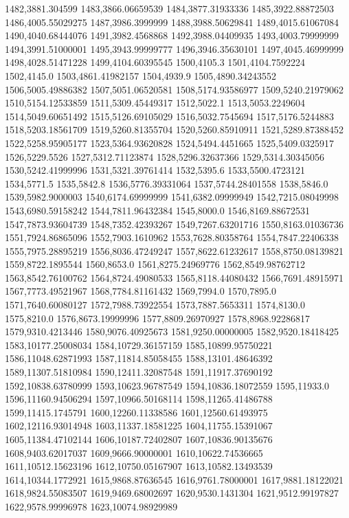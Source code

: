 1482,3881.304599
1483,3866.06659539
1484,3877.31933336
1485,3922.88872503
1486,4005.55029275
1487,3986.3999999
1488,3988.50629841
1489,4015.61067084
1490,4040.68444076
1491,3982.4568868
1492,3988.04409935
1493,4003.79999999
1494,3991.51000001
1495,3943.99999777
1496,3946.35630101
1497,4045.46999999
1498,4028.51471228
1499,4104.60395545
1500,4105.3
1501,4104.7592224
1502,4145.0
1503,4861.41982157
1504,4939.9
1505,4890.34243552
1506,5005.49886382
1507,5051.06520581
1508,5174.93586977
1509,5240.21979062
1510,5154.12533859
1511,5309.45449317
1512,5022.1
1513,5053.2249604
1514,5049.60651492
1515,5126.69105029
1516,5032.7545694
1517,5176.5244883
1518,5203.18561709
1519,5260.81355704
1520,5260.85910911
1521,5289.87388452
1522,5258.95905177
1523,5364.93620828
1524,5494.4451665
1525,5409.0325917
1526,5229.5526
1527,5312.71123874
1528,5296.32637366
1529,5314.30345056
1530,5242.41999996
1531,5321.39761414
1532,5395.6
1533,5500.4723121
1534,5771.5
1535,5842.8
1536,5776.39331064
1537,5744.28401558
1538,5846.0
1539,5982.9000003
1540,6174.69999999
1541,6382.09999949
1542,7215.08049998
1543,6980.59158242
1544,7811.96432384
1545,8000.0
1546,8169.88672531
1547,7873.93604739
1548,7352.42393267
1549,7267.63201716
1550,8163.01036736
1551,7924.86865096
1552,7903.1610962
1553,7628.80358764
1554,7847.22406338
1555,7975.28895219
1556,8036.47249247
1557,8622.61232617
1558,8750.08139821
1559,8722.1895544
1560,8653.0
1561,8275.24969776
1562,8549.98762712
1563,8542.76100762
1564,8724.49080533
1565,8118.44080432
1566,7691.48915971
1567,7773.49521967
1568,7784.81161432
1569,7994.0
1570,7895.0
1571,7640.60080127
1572,7988.73922554
1573,7887.5653311
1574,8130.0
1575,8210.0
1576,8673.19999996
1577,8809.26970927
1578,8968.92286817
1579,9310.4213446
1580,9076.40925673
1581,9250.00000005
1582,9520.18418425
1583,10177.25008034
1584,10729.36157159
1585,10899.95750221
1586,11048.62871993
1587,11814.85058455
1588,13101.48646392
1589,11307.51810984
1590,12411.32087548
1591,11917.37690192
1592,10838.63780999
1593,10623.96787549
1594,10836.18072559
1595,11933.0
1596,11160.94506294
1597,10966.50168114
1598,11265.41486788
1599,11415.1745791
1600,12260.11338586
1601,12560.61493975
1602,12116.93014948
1603,11337.18581225
1604,11755.15391067
1605,11384.47102144
1606,10187.72402807
1607,10836.90135676
1608,9403.62017037
1609,9666.90000001
1610,10622.74536665
1611,10512.15623196
1612,10750.05167907
1613,10582.13493539
1614,10344.1772921
1615,9868.87636545
1616,9761.78000001
1617,9881.18122021
1618,9824.55083507
1619,9469.68002697
1620,9530.1431304
1621,9512.99197827
1622,9578.99996978
1623,10074.98929989
